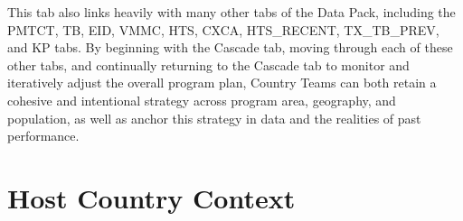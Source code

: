 \documentclass[
  openany]{book}
\begin{document}
This tab also links heavily with many other tabs of the Data Pack,
including the PMTCT, TB, EID, VMMC, HTS, CXCA, HTS\_RECENT, TX\_TB\_PREV,
and KP tabs. By beginning with the Cascade tab, moving through each of
these other tabs, and continually returning to the Cascade tab to
monitor and iteratively adjust the overall program plan, Country Teams
can both retain a cohesive and intentional strategy across program area,
geography, and population, as well as anchor this strategy in data and
the realities of past performance.

\hypertarget{host-country-context}{%
\section{Host Country Context}\label{host-country-context}}

\begin{table}[H]
\centering\begingroup\fontsize{12}{14}\selectfont

\endgroup{}
\end{table}
\end{document}
